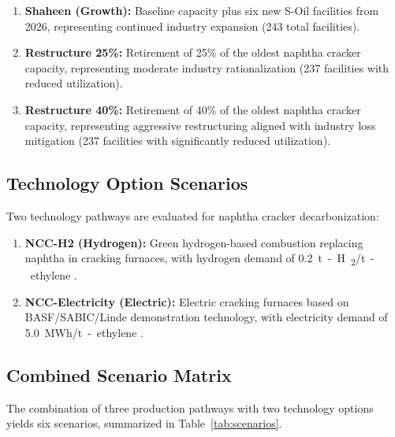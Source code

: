 \documentclass[12pt,a4paper]{article}
\newcommand{\HTwo}{H\textsubscript{2}}
\begin{document}
\begin{enumerate}
\item \textbf{Shaheen (Growth):} Baseline capacity plus six new S-Oil facilities from 2026, representing continued industry expansion (243 total facilities).

\item \textbf{Restructure 25\%:} Retirement of 25\% of the oldest naphtha cracker capacity, representing moderate industry rationalization (237 facilities with reduced utilization).

\item \textbf{Restructure 40\%:} Retirement of 40\% of the oldest naphtha cracker capacity, representing aggressive restructuring aligned with industry loss mitigation (237 facilities with significantly reduced utilization).
\end{enumerate}

\subsection{Technology Option Scenarios}

Two technology pathways are evaluated for naphtha cracker decarbonization:

\begin{enumerate}
\item \textbf{NCC-H2 (Hydrogen):} Green hydrogen-based combustion replacing naphtha in cracking furnaces, with hydrogen demand of \SI{0.2}{t-\HTwo/t-ethylene} \citep{iea2023hydrogen}.

\item \textbf{NCC-Electricity (Electric):} Electric cracking furnaces based on BASF/SABIC/Linde demonstration technology, with electricity demand of \SI{5.0}{MWh/t-ethylene} \citep{basf2024}.
\end{enumerate}

\subsection{Combined Scenario Matrix}

The combination of three production pathways with two technology options yields six scenarios, summarized in Table~\ref{tab:scenarios}.
\end{document}

